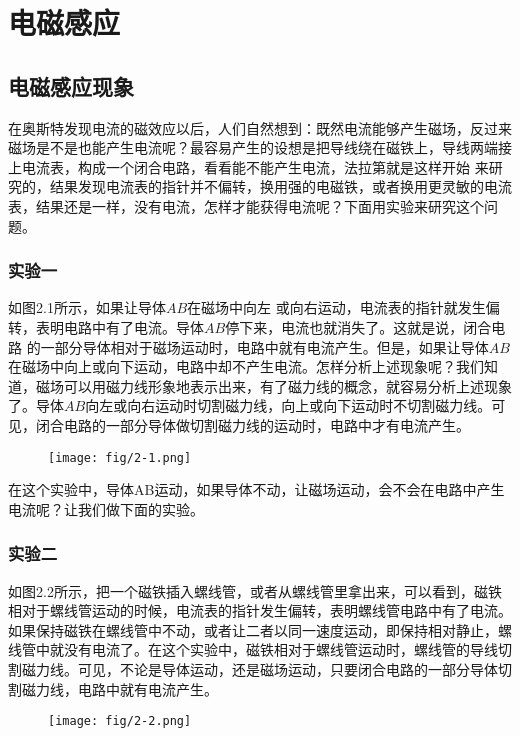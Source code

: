 \chapter{电磁感应}
\section{电磁感应现象}

在奥斯特发现电流的磁效应以后，人们自然想到：既然电流能够产生磁场，反过来磁场是不是也能产生电流呢？最容易产生的设想是把导线绕在磁铁上，导线两端接上电流表，构成一个闭合电路，看看能不能产生电流，法拉第就是这样开始
来研究的，结果发现电流表的指针并不偏转，换用强的电磁铁，或者换用更灵敏的电流表，结果还是一样，没有电流，怎样才能获得电流呢？下面用实验来研究这个问题。


\subsection*{实验一}
如图2.1所示，如果让导体$AB$在磁场中向左
或向右运动，电流表的指针就发生偏转，表明电路中有了电流。导体$AB$停下来，电流也就消失了。这就是说，闭合电路
的一部分导体相对于磁场运动时，电路中就有电流产生。但是，如果让导体$AB$在磁场中向上或向下运动，电路中却不产生电流。怎样分析上述现象呢？我们知道，磁场可以用磁力线形象地表示出来，有了磁力线的概念，就容易分析上述现象了。导体$AB$向左或向右运动时切割磁力线，向上或向下运动时不切割磁力线。可见，闭合电路的一部分导体做切割磁力线的运动时，电路中才有电流产生。
\begin{figure}[htp]\centering
\texttt{[image: fig/2-1.png]}
\caption{}
\end{figure}

在这个实验中，导体AB运动，如果导体不动，让磁场运动，会不会在电路中产生电流呢？让我们做下面的实验。

\subsection*{实验二}

如图2.2所示，把一个磁铁插入螺线管，或者从螺线管里拿出来，可以看到，磁铁相对于螺线管运动的时候，电流表的指针发生偏转，表明螺线管电路中有了电流。如果保持磁铁在螺线管中不动，或者让二者以同一速度运动，即保持相对静止，螺线管中就没有电流了。在这个实验中，磁铁相对于螺线管运动时，螺线管的导线切割磁力线。可见，不论是导体运动，还是磁场运动，只要闭合电路的一部分导体切割磁力线，电路中就有电流产生。
\begin{figure}[htp]\centering
\texttt{[image: fig/2-2.png]}
\caption{}
\end{figure}

